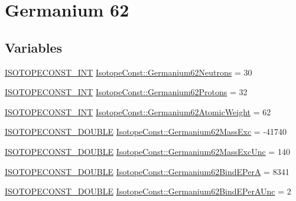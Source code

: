 \hypertarget{group___isotope_const-_germanium-_ge62}{}\section{Germanium 62}
\label{group___isotope_const-_germanium-_ge62}
\subsection*{Variables}
\begin{DoxyCompactItemize}
\item 
\mbox{\hyperlink{group___isotope_const-_macros_ga5f18360b3e99483a35c32d789e62621c}{I\+S\+O\+T\+O\+P\+E\+C\+O\+N\+S\+T\+\_\+\+I\+NT}} \mbox{\hyperlink{group___isotope_const-_germanium-_ge62_ga24ad6f074fe2453a469978283abe35ef}{Isotope\+Const\+::\+Germanium62\+Neutrons}} = 30
\item 
\mbox{\hyperlink{group___isotope_const-_macros_ga5f18360b3e99483a35c32d789e62621c}{I\+S\+O\+T\+O\+P\+E\+C\+O\+N\+S\+T\+\_\+\+I\+NT}} \mbox{\hyperlink{group___isotope_const-_germanium-_ge62_gaf15ce12cce7a09ebd0403f6449c98d54}{Isotope\+Const\+::\+Germanium62\+Protons}} = 32
\item 
\mbox{\hyperlink{group___isotope_const-_macros_ga5f18360b3e99483a35c32d789e62621c}{I\+S\+O\+T\+O\+P\+E\+C\+O\+N\+S\+T\+\_\+\+I\+NT}} \mbox{\hyperlink{group___isotope_const-_germanium-_ge62_ga27607ece0fd5d42c0b98a98db076e782}{Isotope\+Const\+::\+Germanium62\+Atomic\+Weight}} = 62
\item 
\mbox{\hyperlink{group___isotope_const-_macros_ga8f45a7272ce02c0b4c65c44636ed719a}{I\+S\+O\+T\+O\+P\+E\+C\+O\+N\+S\+T\+\_\+\+D\+O\+U\+B\+LE}} \mbox{\hyperlink{group___isotope_const-_germanium-_ge62_gadb33c0682609cbe1b52edae4c3af20bc}{Isotope\+Const\+::\+Germanium62\+Mass\+Exc}} = -\/41740
\item 
\mbox{\hyperlink{group___isotope_const-_macros_ga8f45a7272ce02c0b4c65c44636ed719a}{I\+S\+O\+T\+O\+P\+E\+C\+O\+N\+S\+T\+\_\+\+D\+O\+U\+B\+LE}} \mbox{\hyperlink{group___isotope_const-_germanium-_ge62_ga6c3ea7e6fbf39564e13b92374cced442}{Isotope\+Const\+::\+Germanium62\+Mass\+Exc\+Unc}} = 140
\item 
\mbox{\hyperlink{group___isotope_const-_macros_ga8f45a7272ce02c0b4c65c44636ed719a}{I\+S\+O\+T\+O\+P\+E\+C\+O\+N\+S\+T\+\_\+\+D\+O\+U\+B\+LE}} \mbox{\hyperlink{group___isotope_const-_germanium-_ge62_ga9df2bf4f8395f8cc9e85caa030db09fb}{Isotope\+Const\+::\+Germanium62\+Bind\+E\+PerA}} = 8341
\item 
\mbox{\hyperlink{group___isotope_const-_macros_ga8f45a7272ce02c0b4c65c44636ed719a}{I\+S\+O\+T\+O\+P\+E\+C\+O\+N\+S\+T\+\_\+\+D\+O\+U\+B\+LE}} \mbox{\hyperlink{group___isotope_const-_germanium-_ge62_gab375fcdee3d6d02df73a490602fe73a8}{Isotope\+Const\+::\+Germanium62\+Bind\+E\+Per\+A\+Unc}} = 2

\end{DoxyCompactItemize}
